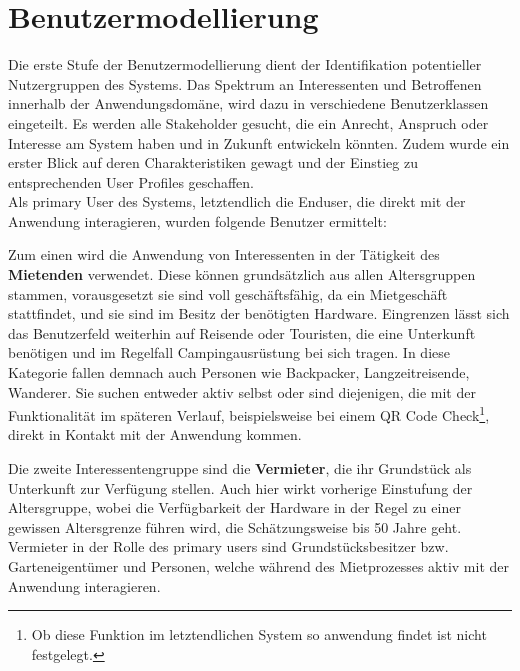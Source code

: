 
\section{Benutzermodellierung}
Die erste Stufe der Benutzermodellierung dient der Identifikation potentieller Nutzergruppen des Systems.
Das Spektrum an Interessenten und Betroffenen innerhalb der Anwendungsdomäne, wird dazu in
verschiedene Benutzerklassen eingeteilt. Es werden alle Stakeholder gesucht, die ein Anrecht, Anspruch oder Interesse am System haben und in Zukunft entwickeln könnten. Zudem wurde ein erster Blick auf deren Charakteristiken gewagt und der Einstieg zu entsprechenden User Profiles geschaffen.\\
 
Als primary User des Systems, letztendlich die Enduser, die direkt mit der Anwendung interagieren, wurden folgende Benutzer ermittelt:
 
Zum einen wird die Anwendung von Interessenten in der Tätigkeit des \textbf{Mietenden} verwendet.
Diese können grundsätzlich aus allen Altersgruppen stammen, vorausgesetzt sie sind voll geschäftsfähig, da ein Mietgeschäft stattfindet, und sie sind im Besitz der benötigten Hardware.
Eingrenzen lässt sich das Benutzerfeld weiterhin auf Reisende oder Touristen, die eine Unterkunft benötigen und im Regelfall Campingausrüstung bei sich tragen. In diese Kategorie fallen demnach auch Personen wie Backpacker, Langzeitreisende, Wanderer.
Sie suchen entweder aktiv selbst oder sind diejenigen, die mit der Funktionalität im späteren Verlauf, beispielsweise bei einem QR Code Check\footnote{Ob diese Funktion im letztendlichen System so anwendung findet ist nicht festgelegt.}, direkt in Kontakt mit der Anwendung kommen.
 
Die zweite Interessentengruppe sind die \textbf{Vermieter}, die ihr Grundstück als Unterkunft zur Verfügung stellen. Auch hier wirkt vorherige Einstufung der Altersgruppe, wobei die Verfügbarkeit der Hardware in der Regel zu einer gewissen Altersgrenze führen wird, die Schätzungsweise bis 50 Jahre geht.
Vermieter in der Rolle des primary users sind Grundstücksbesitzer bzw. Garteneigentümer und Personen, welche während des Mietprozesses aktiv mit der Anwendung interagieren.\\
 
